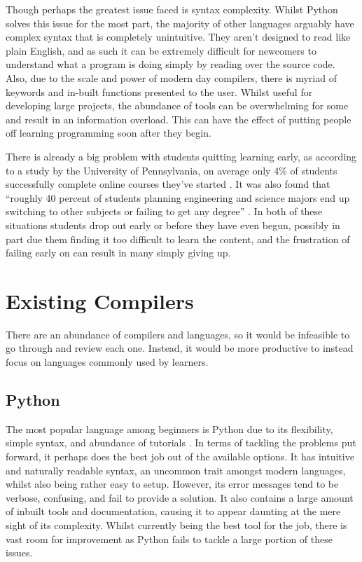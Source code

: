 \documentclass[
]{report}
\begin{document}
Though perhaps the greatest issue faced is syntax complexity. Whilst
Python solves this issue for the most part, the majority of other
languages arguably have complex syntax that is completely unintuitive.
They aren't designed to read like plain English, and as such it can be
extremely difficult for newcomers to understand what a program is doing
simply by reading over the source code. Also, due to the scale and power
of modern day compilers, there is myriad of \glspl{keyword} and in-built
functions presented to the user. Whilst useful for developing large
projects, the abundance of tools can be overwhelming for some and result
in an information overload. This can have the effect of putting people
off learning programming soon after they begin.

There is already a big problem with students quitting learning early, as
according to a study by the University of Pennsylvania, on average only
4\% of students successfully complete online courses they've started
\cite{upenn-report}. It was also found that ``roughly 40 percent of students
planning engineering and science majors end up switching to other
subjects or failing to get any degree'' \cite{nytimes-article}. In both of these
situations students drop out early or before they have even begun,
possibly in part due them finding it too difficult to learn the
content, and the frustration of failing early on can result in many
simply giving up.

\section{Existing Compilers}
There are an abundance of compilers and languages, so it would be
infeasible to go through and review each one. Instead, it would be more
productive to instead focus on languages commonly used by learners.

\subsection{Python}
The most popular language among beginners is Python due to its
flexibility, simple syntax, and abundance of tutorials \cite{simplilearn-article}. In
terms of tackling the problems put forward, it perhaps does the best job
out of the available options. It has intuitive and naturally readable
syntax, an uncommon trait amongst modern languages, whilst also being
rather easy to setup. However, its error messages tend to be verbose,
confusing, and fail to provide a solution. It also contains a large
amount of inbuilt tools and documentation, causing it to appear daunting
at the mere sight of its complexity. Whilst currently being the best
tool for the job, there is vast room for improvement as Python fails to
tackle a large portion of these issues.
\end{document}
